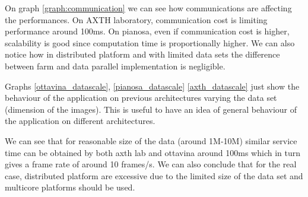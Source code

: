 On graph \ref{graph:communication} we can see how communications are affecting the performances.
On AXTH laboratory, communication cost is limiting performance around 100ms.
On pianosa, even if communication cost is higher, scalability is good since computation time is proportionally higher.
We can also notice how in distributed platform and with limited data sets the difference between farm and data parallel implementation is negligible.

Graphs \ref{ottavina_datascale}, \ref{pianosa_datascale} \ref{axth_datascale} just show the behaviour of the application on previous architectures varying the data set (dimension of the images). 
This is useful to have an idea of general behaviour of the application on different architectures.

We can see that for reasonable size of the data (around 1M-10M) similar service time can be obtained by both axth lab and ottavina around 100ms which in turn gives a frame rate of around 10 frames/s.
We can also conclude that for the real case, distributed platform are excessive due to the limited size of the data set and multicore platforms should be used.